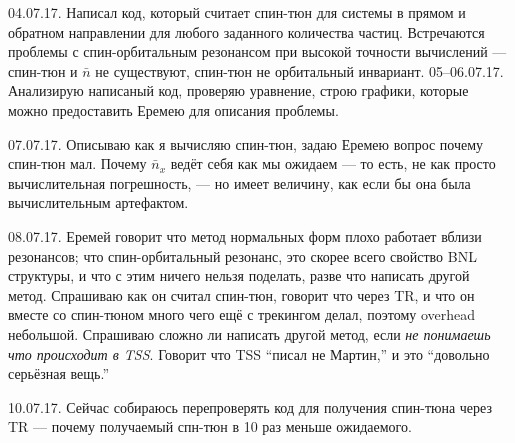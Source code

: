 \documentclass{report}
\begin{document}
04.07.17. Написал код, который считает спин-тюн для системы в прямом и обратном направлении для любого заданного количества частиц. Встречаются проблемы с спин-орбитальным резонансом при высокой точности вычислений --- спин-тюн и $\bar{n}$ не существуют, спин-тюн не орбитальный инвариант.
05--06.07.17. Анализирую написаный код, проверяю уравнение, строю графики, которые можно предоставить Еремею для описания проблемы.

07.07.17. Описываю как я вычисляю спин-тюн, задаю Еремею вопрос почему спин-тюн мал. Почему $\bar{n}_x$ ведёт себя как мы ожидаем --- то есть, не как просто вычислительная погрешность, --- но имеет величину, как если бы она была вычислительным артефактом. 

08.07.17. Еремей говорит что метод нормальных форм плохо работает вблизи резонансов; что спин-орбитальный резонанс, это скорее всего свойство BNL структуры, и что с этим ничего нельзя поделать, разве что написать другой метод. Спрашиваю как он считал спин-тюн, говорит что через TR, и что он вместе со спин-тюном много чего ещё с трекингом делал, поэтому overhead небольшой. Спрашиваю сложно ли написать другой метод, если \emph{не понимаешь что происходит в TSS}. Говорит что TSS ``писал не Мартин,'' и это ``довольно серьёзная вещь.''

10.07.17. Сейчас собираюсь перепроверять код для получения спин-тюна через TR --- почему получаемый спн-тюн в 10 раз меньше ожидаемого.
	
\end{document}
